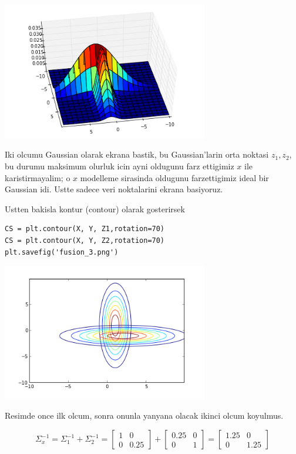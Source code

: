 \documentclass[12pt,fleqn]{article}\usepackage{../common}
\begin{document}
\includegraphics[height=6cm]{fusion_1.png}

Iki olcumu Gaussian olarak ekrana bastik, bu Gaussian'larin orta noktasi
$z_1,z_2$, bu durumu maksimum olurluk icin ayni oldugunu farz ettigimiz $x$
ile karistirmayalim; o $x$ modelleme sirasinda oldugunu farzettigimiz ideal
bir Gaussian idi. Ustte sadece veri noktalarini ekrana basiyoruz. 


Ustten bakisla kontur (contour) olarak gosterirsek 

\begin{verbatim}
CS = plt.contour(X, Y, Z1,rotation=70)
CS = plt.contour(X, Y, Z2,rotation=70)
plt.savefig('fusion_3.png')
\end{verbatim}

\includegraphics[height=6cm]{fusion_3.png}


Resimde once ilk olcum, sonra onunla yanyana olacak ikinci olcum koyulmus. 

$$ \Sigma_x^{-1} = \Sigma_1^{-1} + \Sigma_2^{-1}  =
\left[\begin{array}{cc}
1 & 0 \\ 0 & 0.25
\end{array}\right] + 
\left[\begin{array}{cc}
0.25 & 0 \\ 0 & 1
\end{array}\right] =
\left[\begin{array}{cc}
1.25 & 0 \\ 0 & 1.25
\end{array}\right] 
$$
\end{document}
